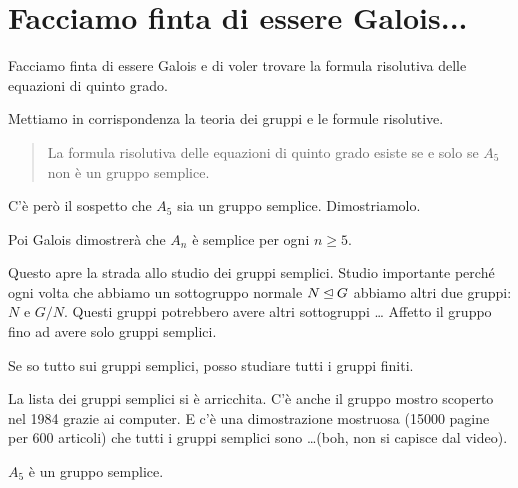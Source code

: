 \section{Facciamo finta di essere Galois...}
\label{sec:coniugio_galois}

Facciamo finta di essere Galois e di voler trovare la formula risolutiva delle equazioni di quinto grado.

Mettiamo in corrispondenza la teoria dei gruppi e le formule risolutive.

\begin{quotation}
	La formula risolutiva delle equazioni di quinto grado esiste se e solo se $A_5$ non è un gruppo semplice.
\end{quotation}

C'è però il sospetto che $A_5$ sia un gruppo semplice.
Dimostriamolo.

Poi Galois dimostrerà che $A_n$ è semplice per ogni $n \ge 5$.

Questo apre la strada allo studio dei gruppi semplici.
Studio importante perché ogni volta che abbiamo un sottogruppo normale $N \unlhd G$ abbiamo altri due gruppi: $N$ e $G/N$.
Questi gruppi potrebbero avere altri sottogruppi \ldots
Affetto il gruppo fino ad avere solo gruppi semplici.

Se so tutto sui gruppi semplici, posso studiare tutti i gruppi finiti.

La lista dei gruppi semplici si è arricchita.
C'è anche il gruppo mostro scoperto nel 1984 grazie ai computer.
E c'è una dimostrazione mostruosa (15000 pagine per 600 articoli) che tutti i gruppi semplici sono \ldots (boh, non si
capisce dal video).

\begin{teorema}
	\label{th:a5_semplice}
	$A_5$ è un gruppo semplice.
\end{teorema}

